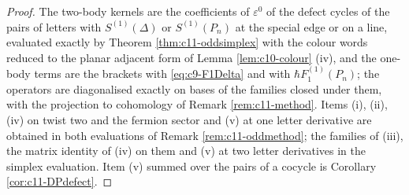 \begin{proof}
The two-body kernels are the coefficients of $\varepsilon^0$ of the defect cycles of the pairs of letters with $S^{(1)}(\Delta)$ or $S^{(1)}(P_n)$ at the special edge or on a line, evaluated exactly by Theorem \ref{thm:c11-oddsimplex} with the colour words reduced to the planar adjacent form of Lemma \ref{lem:c10-colour} (iv), and the one-body terms are the brackets with \eqref{eq:c9-F1Delta} and with $\hbar F_1^{(1)}(P_n)$; the operators are diagonalised exactly on bases of the families closed under them, with the projection to cohomology of Remark \ref{rem:c11-method}. Items (i), (ii), (iv) on twist two and the fermion sector and (v) at one letter derivative are obtained in both evaluations of Remark \ref{rem:c11-oddmethod}; the families of (iii), the matrix identity of (iv) on them and (v) at two letter derivatives in the simplex evaluation. Item (v) summed over the pairs of a cocycle is Corollary \ref{cor:c11-DPdefect}.
\end{proof}

